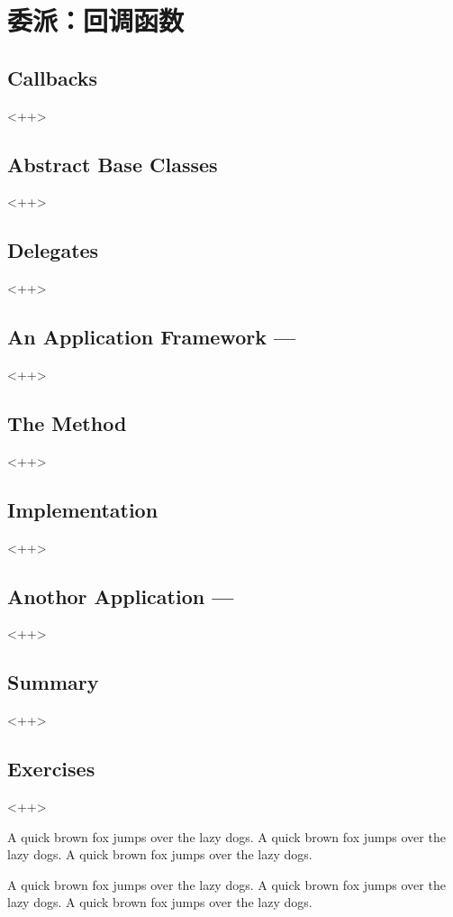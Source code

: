 

\chapter{委派：回调函数}
\label{ch:Delegates}

\section{Callbacks}<++>

\section{Abstract Base Classes}<++>

\section{Delegates}<++>

\section{An Application Framework ---}<++>

\section{The  Method}<++>

\section{Implementation}<++>

\section{Anothor Application ---}<++>

\section{Summary}<++>

\section{Exercises}<++>

A quick brown fox jumps over the lazy dogs.
A quick brown fox jumps over the lazy dogs.
A quick brown fox jumps over the lazy dogs.

A quick brown fox jumps over the lazy dogs.
A quick brown fox jumps over the lazy dogs.
A quick brown fox jumps over the lazy dogs.



